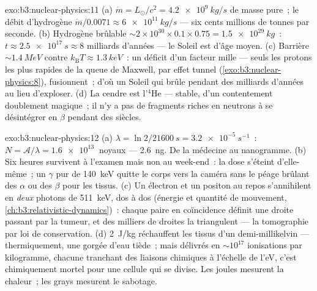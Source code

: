\begin{solution}{exo:b3:nuclear-physics:11}
(a) $\dot m = L_\odot/c^2 = \qty{4.2e9}{kg/s}$ de masse pure~; le
débit d'hydrogène $\dot m/0.0071 \approx \qty{6e11}{kg/s}$ ---
six cents millions de tonnes par seconde. (b) Hydrogène brûlable
${\sim}2\times10^{30}\times0.1\times0.75 = \qty{1.5e29}{kg}$~:
$t \approx \qty{2.5e17}{s} \approx 8$ milliards d'années --- le
Soleil est d'âge moyen. (c) Barrière ${\sim}\qty{1.4}{MeV}$ contre
$k_{\text{B}}T \approx \qty{1.3}{keV}$~: un déficit d'un facteur
mille --- seuls les protons les plus rapides de la queue de Maxwell,
par effet tunnel (\cref{exo:b3:nuclear-physics:8}), fusionnent~; d'où
un Soleil qui brûle pendant des milliards d'années au lieu
d'exploser. (d) La cendre est l'$^4$He --- stable, d'un contentement
doublement magique~; il n'y a pas de fragments riches en neutrons à
se désintégrer en $\beta$ pendant des siècles.
\end{solution}

\begin{solution}{exo:b3:nuclear-physics:12}
(a) $\lambda = \ln2/\qty{21600}{s} = \qty{3.2e-5}{s^{-1}}$~:
$N = \mathcal A/\lambda = \qty{1.6e13}{}$ noyaux ---
\qty{2.6}{ng}. De la médecine au nanogramme. (b) Six heures survivent
à l'examen mais non au week-end~: la dose s'éteint d'elle-même~; un
$\gamma$ pur de \qty{140}{keV} quitte le corps vers la caméra sans le
péage brûlant des $\alpha$ ou des $\beta$ pour les tissus. (c) Un
électron et un positon au repos s'annihilent en \emph{deux} photons
de \qty{511}{keV}, dos à dos (énergie et quantité de mouvement,
\cref{ch:b3:relativistic-dynamics})~: chaque paire en coïncidence
définit une droite passant par la tumeur, et des milliers de droites
la triangulent --- la tomographie par loi de conservation. (d)
\qty{2}{J/kg} réchauffent les tissus d'un demi-millikelvin ---
thermiquement, une gorgée d'eau tiède~; mais délivrés en
${\sim}10^{17}$ ionisations par kilogramme, chacune tranchant des
liaisons chimiques à l'échelle de l'\unit{eV}, c'est chimiquement
mortel pour une cellule qui se divise. Les joules mesurent la
chaleur~; les grays mesurent le sabotage.
\end{solution}

